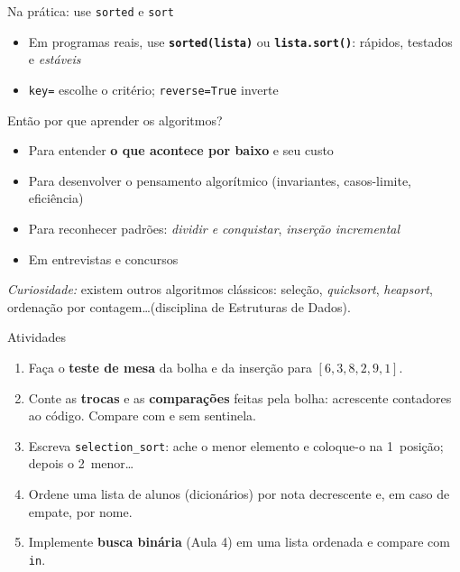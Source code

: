 \documentclass[aspectratio=169,10pt,t]{beamer}
\begin{document}
\begin{frame}{Na prática: use \texttt{sorted} e \texttt{sort}}
  \begin{itemize}
    \item Em programas reais, use \textbf{\texttt{sorted(lista)}} ou \textbf{\texttt{lista.sort()}}: rápidos, testados e \emph{estáveis}
    \item \texttt{key=} escolhe o critério; \texttt{reverse=True} inverte
  \end{itemize}
  \begin{exampleblock}{Então por que aprender os algoritmos?}
    \begin{itemize}\small
      \item Para entender \textbf{o que acontece por baixo} e seu custo
      \item Para desenvolver o pensamento algorítmico (invariantes, casos-limite, eficiência)
      \item Para reconhecer padrões: \emph{dividir e conquistar}, \emph{inserção incremental}
      \item Em entrevistas e concursos
    \end{itemize}
  \end{exampleblock}
  \small \emph{Curiosidade:} existem outros algoritmos clássicos: seleção, \emph{quicksort}, \emph{heapsort}, ordenação por contagem\ldots (disciplina de Estruturas de Dados).
\end{frame}

\begin{frame}{Atividades}
  \begin{enumerate}
    \item Faça o \textbf{teste de mesa} da bolha e da inserção para \([6,3,8,2,9,1]\).
    \item Conte as \textbf{trocas} e as \textbf{comparações} feitas pela bolha: acrescente contadores ao código. Compare com e sem sentinela.
    \item Escreva \texttt{selection\_sort}: ache o menor elemento e coloque-o na 1\textordfeminine\ posição; depois o 2\textordmasculine\ menor\ldots
    \item Ordene uma lista de alunos (dicionários) por nota decrescente e, em caso de empate, por nome.
    \item Implemente \textbf{busca binária} (Aula 4) em uma lista ordenada e compare com \texttt{in}.
  \end{enumerate}
\end{frame}

\end{document}
